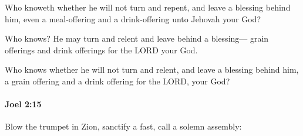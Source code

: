 			\begin{versebox}
					\item[BHS] 
					\item[LXX] 
					\item[ASV] Who knoweth whether he will not turn and repent, and leave a blessing behind him, even a meal-offering and a drink-offering unto Jehovah your God?
					\item[NIV] Who knows? He may turn and relent and leave behind a blessing— grain offerings and drink offerings for the LORD your God.
					\item[NRSV] Who knows whether he will not turn and relent, and leave a blessing behind him, a grain offering and a drink offering for the LORD, your God?
			\end{versebox}

		\paragraph{Joel 2:15} %
			\label{JOEL-2-15}

			Blow the trumpet in Zion, sanctify a fast, call a solemn assembly:

